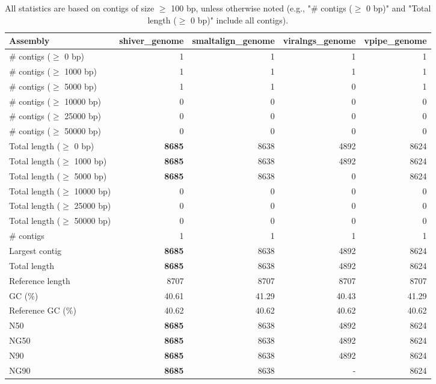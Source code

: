 \documentclass[12pt,a4paper]{article}
\begin{document}
\begin{table}[ht]
\begin{center}
\caption{All statistics are based on contigs of size $\geq$ 100 bp, unless otherwise noted (e.g., "\# contigs ($\geq$ 0 bp)" and "Total length ($\geq$ 0 bp)" include all contigs).}
\begin{tabular}{|l*{4}{|r}|}
\hline
Assembly & shiver\_genome & smaltalign\_genome & viralngs\_genome & vpipe\_genome \\ \hline
\# contigs ($\geq$ 0 bp) & 1 & 1 & 1 & 1 \\ \hline
\# contigs ($\geq$ 1000 bp) & 1 & 1 & 1 & 1 \\ \hline
\# contigs ($\geq$ 5000 bp) & 1 & 1 & 0 & 1 \\ \hline
\# contigs ($\geq$ 10000 bp) & 0 & 0 & 0 & 0 \\ \hline
\# contigs ($\geq$ 25000 bp) & 0 & 0 & 0 & 0 \\ \hline
\# contigs ($\geq$ 50000 bp) & 0 & 0 & 0 & 0 \\ \hline
Total length ($\geq$ 0 bp) & {\bf 8685} & 8638 & 4892 & 8624 \\ \hline
Total length ($\geq$ 1000 bp) & {\bf 8685} & 8638 & 4892 & 8624 \\ \hline
Total length ($\geq$ 5000 bp) & {\bf 8685} & 8638 & 0 & 8624 \\ \hline
Total length ($\geq$ 10000 bp) & 0 & 0 & 0 & 0 \\ \hline
Total length ($\geq$ 25000 bp) & 0 & 0 & 0 & 0 \\ \hline
Total length ($\geq$ 50000 bp) & 0 & 0 & 0 & 0 \\ \hline
\# contigs & 1 & 1 & 1 & 1 \\ \hline
Largest contig & {\bf 8685} & 8638 & 4892 & 8624 \\ \hline
Total length & {\bf 8685} & 8638 & 4892 & 8624 \\ \hline
Reference length & 8707 & 8707 & 8707 & 8707 \\ \hline
GC (\%) & 40.61 & 41.29 & 40.43 & 41.29 \\ \hline
Reference GC (\%) & 40.62 & 40.62 & 40.62 & 40.62 \\ \hline
N50 & {\bf 8685} & 8638 & 4892 & 8624 \\ \hline
NG50 & {\bf 8685} & 8638 & 4892 & 8624 \\ \hline
N90 & {\bf 8685} & 8638 & 4892 & 8624 \\ \hline
NG90 & {\bf 8685} & 8638 & - & 8624 \\ \hline

\end{tabular}
\end{center}
\end{table}
\end{document}
